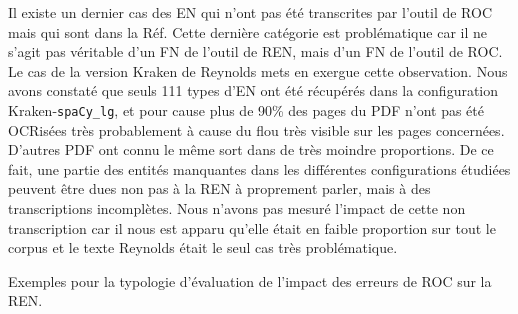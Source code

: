Il existe un dernier cas des EN qui n'ont pas été transcrites par l'outil de ROC mais qui sont dans la Réf. Cette dernière catégorie est problématique car il ne s'agit pas véritable d'un FN de l'outil de REN, mais d'un FN de l'outil de ROC. 
Le cas de la version Kraken de Reynolds mets en exergue cette observation. Nous avons constaté que seuls 111 types d'EN ont été récupérés dans la configuration Kraken-\texttt{spaCy\_lg}, et pour cause plus de 90\% des pages du PDF n'ont pas été OCRisées très probablement à cause du flou très visible sur les pages concernées. D'autres PDF ont connu le même sort dans de très moindre proportions. De ce fait, une partie des entités manquantes dans les différentes configurations étudiées peuvent être dues non pas à la REN à proprement parler, mais à des transcriptions incomplètes. Nous n'avons pas mesuré l'impact de cette non transcription car il nous est apparu qu'elle était en faible proportion sur tout le corpus et le texte Reynolds était le seul cas très problématique. 


\begin{table}[h!]
    \centering
    

    \caption{Exemples pour la typologie d'évaluation de l'impact des erreurs de ROC sur la REN.}
    \label{tab:typo_eval}
\end{table}




%    
%

